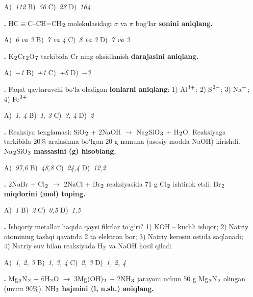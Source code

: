 \documentclass[11pt,a4paper]{article}
\renewcommand{\textsubscript}[1]{\ensuremath{_{\text{\fontsize{8}{8}\selectfont #1}}}}
\renewcommand{\textsuperscript}[1]{\ensuremath{^{\text{\fontsize{8}{8}\selectfont #1}}}}
\newcommand{\qn}[1]{\textbf{\fontsize{11.5}{13}\selectfont #1}}
\newcommand{\qsep}{\par\vspace{1pt}\noindent\rule{0pt}{0.4pt}\par\vspace{5pt}}
\begin{document}
\begin{multicols}{2}
\noindent A)~\textsl{112} \hfill B)~\textsl{56} \hfill C)~\textsl{28} \hfill D)~\textsl{164}\par
\qsep
\noindent\qn{11.} HC$\equiv$C--CH=CH\textsubscript{2} molekulasidagi $\sigma$ va $\pi$ bog`lar \textbf{sonini aniqlang.}

\noindent A)~\textsl{6 va 3} \hfill B)~\textsl{7 va 4} \hfill C)~\textsl{8 va 3} \hfill D)~\textsl{7 va 3}\par
\qsep
\noindent\qn{12.} K\textsubscript{2}Cr\textsubscript{2}O\textsubscript{7} tarkibida Cr ning oksidlanish \textbf{darajasini aniqlang.}

\noindent A)~\textsl{$-$1} \hfill B)~\textsl{+1} \hfill C)~\textsl{+6} \hfill D)~\textsl{$-$3}\par
\qsep
\noindent\qn{13.} Faqat qaytaruvchi bo`la oladigan \textbf{ionlarni aniqlang}: 1) Al\textsuperscript{3+}; 2) S\textsuperscript{2$-$}; 3) Na\textsuperscript{+}; 4) Fe\textsuperscript{3+}

\noindent A)~\textsl{1, 4} \hfill B)~\textsl{1, 3} \hfill C)~\textsl{3, 4} \hfill D)~\textsl{2}\par
\qsep
\noindent\qn{14.} Reaksiya tenglamasi: SiO\textsubscript{2} + 2NaOH $\to$ Na\textsubscript{2}SiO\textsubscript{3} + H\textsubscript{2}O. Reaksiyaga tarkibida 20\% aralashma bo`lgan 20 g namuna (asosiy modda NaOH) kirishdi. Na\textsubscript{2}SiO\textsubscript{3} \textbf{massasini (g) hisoblang.}

\noindent A)~\textsl{97,6} \hfill B)~\textsl{48,8} \hfill C)~\textsl{24,4} \hfill D)~\textsl{12,2}\par
\qsep
\noindent\qn{15.} 2NaBr + Cl\textsubscript{2} $\to$ 2NaCl + Br\textsubscript{2} reaksiyasida 71 g Cl\textsubscript{2} ishtirok etdi. Br\textsubscript{2} \textbf{miqdorini (mol) toping.}

\noindent A)~\textsl{1} \hfill B)~\textsl{2} \hfill C)~\textsl{0,5} \hfill D)~\textsl{1,5}\par
\qsep
\noindent\qn{16.} Ishqoriy metallar haqida qaysi fikrlar to`g`ri? 1) KOH -- kuchli ishqor; 2) Natriy atomining tashqi qavatida 2 ta elektron bor; 3) Natriy kerosin ostida saqlanadi; 4) Natriy suv bilan reaksiyada H\textsubscript{2} va NaOH hosil qiladi

\noindent A)~\textsl{1, 2, 3} \hfill B)~\textsl{1, 3, 4} \hfill C)~\textsl{2, 3} \hfill D)~\textsl{1, 2, 4}\par
\qsep
\noindent\qn{17.} Mg\textsubscript{3}N\textsubscript{2} + 6H\textsubscript{2}O $\to$ 3Mg(OH)\textsubscript{2} + 2NH\textsubscript{3} jarayoni uchun 50 g Mg\textsubscript{3}N\textsubscript{2} olingan (unum 90\%). NH\textsubscript{3} \textbf{hajmini (l, n.sh.) aniqlang.}


\end{multicols}
\end{document}
